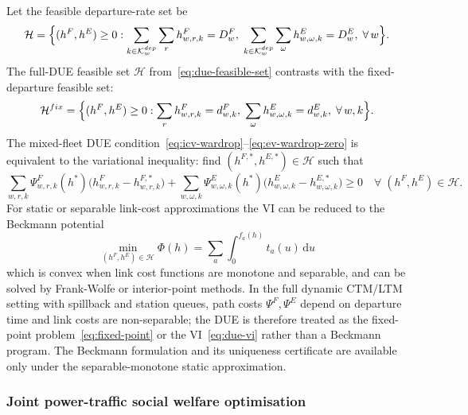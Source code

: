 Let the feasible departure-rate set be
\begin{equation}
  \mathcal{H}
  = \Bigl\{
    (h^F, h^E) \ge 0 :
    \sum_{k \in \mathcal{K}^{dep}_w}\sum_{r} h^F_{w,r,k} = D^F_w,\;
    \sum_{k \in \mathcal{K}^{dep}_w}\sum_{\omega} h^E_{w,\omega,k} = D^E_w,\;
    \forall\, w
  \Bigr\}.
  \label{eq:due-feasible-set}
\end{equation}
The full-DUE feasible set $\mathcal{H}$ from~\eqref{eq:due-feasible-set}
contrasts with the fixed-departure feasible set:
\begin{equation}
  \mathcal{H}^{fix}
  = \Bigl\{
    (h^F, h^E) \ge 0 :
    \sum_{r} h^F_{w,r,k} = d^F_{w,k},\;
    \sum_{\omega} h^E_{w,\omega,k} = d^E_{w,k},\;
    \forall\, w, k
  \Bigr\}.
  \label{eq:due-feasible-set-fix}
\end{equation}
The mixed-fleet DUE condition~\eqref{eq:icv-wardrop}--\eqref{eq:ev-wardrop-zero}
is equivalent to the variational inequality: find
$(h^{F,*}, h^{E,*}) \in \mathcal{H}$ such that
\begin{equation}
  \sum_{w,r,k}
    \Psi^F_{w,r,k}(h^*)
    \bigl(h^F_{w,r,k} - h^{F,*}_{w,r,k}\bigr)
  +
  \sum_{w,\omega,k}
    \Psi^E_{w,\omega,k}(h^*)
    \bigl(h^E_{w,\omega,k} - h^{E,*}_{w,\omega,k}\bigr)
  \ge 0
  \quad
  \forall\; (h^F, h^E) \in \mathcal{H}.
  \label{eq:due-vi}
\end{equation}
For static or separable link-cost approximations the VI can be reduced
to the Beckmann potential
\begin{equation}
  \min_{(h^F,h^E) \in \mathcal{H}}
  \Phi(h) = \sum_a \int_0^{f_a(h)} t_a(u)\,\mathrm{d}u
  \label{eq:beckmann}
\end{equation}
which is convex when link cost functions are monotone and separable, and
can be solved by Frank-Wolfe or interior-point methods.  In the full
dynamic CTM/LTM setting with spillback and station queues, path costs
$\Psi^F, \Psi^E$ depend on departure time and link costs are
non-separable; the DUE is therefore treated as the fixed-point
problem~\eqref{eq:fixed-point} or the VI~\eqref{eq:due-vi} rather than
a Beckmann program.  The Beckmann formulation and its uniqueness
certificate are available only under the separable-monotone static
approximation.

\subsubsection{Joint power-traffic social welfare optimisation}
\label{sec:traffic-joint-sw}

